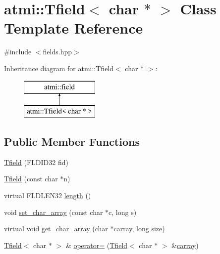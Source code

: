 \hypertarget{classatmi_1_1_tfield_3_01char_01_5_01_4}{}\section{atmi\+:\+:Tfield$<$ char $\ast$ $>$ Class Template Reference}
\label{classatmi_1_1_tfield_3_01char_01_5_01_4}


{\ttfamily \#include $<$fields.\+hpp$>$}

Inheritance diagram for atmi\+:\+:Tfield$<$ char $\ast$ $>$\+:\begin{figure}[H]
\begin{center}
\leavevmode
\includegraphics[height=2.000000cm]{classatmi_1_1_tfield_3_01char_01_5_01_4}
\end{center}
\end{figure}
\subsection*{Public Member Functions}
\begin{DoxyCompactItemize}
\item 
\hyperlink{classatmi_1_1_tfield_3_01char_01_5_01_4_ad16891d15a65e85408962ec962e57bd8}{Tfield} (F\+L\+D\+I\+D32 fid)
\item 
\hyperlink{classatmi_1_1_tfield_3_01char_01_5_01_4_a197bf4f86d8053adcf8afdcd839b85cc}{Tfield} (const char $\ast$n)
\item 
virtual F\+L\+D\+L\+E\+N32 \hyperlink{classatmi_1_1_tfield_3_01char_01_5_01_4_aa97dec8559724186b62997409f04bf3f}{length} ()
\item 
void \hyperlink{classatmi_1_1_tfield_3_01char_01_5_01_4_a57def5d907b0f5671a5dae41bccd64f1}{set\+\_\+char\+\_\+array} (const char $\ast$c, long s)
\item 
virtual void \hyperlink{classatmi_1_1_tfield_3_01char_01_5_01_4_a9ba99e63bbc32091f3a0614b2fe186fe}{get\+\_\+char\+\_\+array} (char $\ast$\hyperlink{group__fml_ga8b57f9a4e2453d8e5d82ac0016e35e87}{carray}, long size)
\item 
\hyperlink{classatmi_1_1_tfield}{Tfield}$<$ char $\ast$ $>$ \& \hyperlink{classatmi_1_1_tfield_3_01char_01_5_01_4_a486559e383ca6ae8002cb527901b716f}{operator=} (\hyperlink{classatmi_1_1_tfield}{Tfield}$<$ char $\ast$ $>$ \&\hyperlink{group__fml_ga8b57f9a4e2453d8e5d82ac0016e35e87}{carray})
\end{DoxyCompactItemize}
